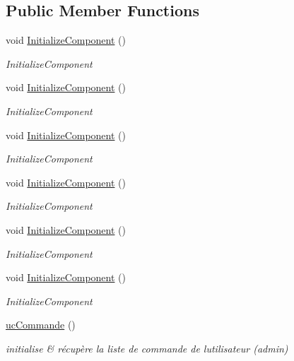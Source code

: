 \subsection*{Public Member Functions}
\begin{DoxyCompactItemize}
\item 
void \hyperlink{classnewPizza1_1_1ucCommande_a3f6251cc87dd9f2a2db45c5413ce1711}{Initialize\+Component} ()
\begin{DoxyCompactList}\small\item\em Initialize\+Component \end{DoxyCompactList}\item 
void \hyperlink{classnewPizza1_1_1ucCommande_a3f6251cc87dd9f2a2db45c5413ce1711}{Initialize\+Component} ()
\begin{DoxyCompactList}\small\item\em Initialize\+Component \end{DoxyCompactList}\item 
void \hyperlink{classnewPizza1_1_1ucCommande_a3f6251cc87dd9f2a2db45c5413ce1711}{Initialize\+Component} ()
\begin{DoxyCompactList}\small\item\em Initialize\+Component \end{DoxyCompactList}\item 
void \hyperlink{classnewPizza1_1_1ucCommande_a3f6251cc87dd9f2a2db45c5413ce1711}{Initialize\+Component} ()
\begin{DoxyCompactList}\small\item\em Initialize\+Component \end{DoxyCompactList}\item 
void \hyperlink{classnewPizza1_1_1ucCommande_a3f6251cc87dd9f2a2db45c5413ce1711}{Initialize\+Component} ()
\begin{DoxyCompactList}\small\item\em Initialize\+Component \end{DoxyCompactList}\item 
void \hyperlink{classnewPizza1_1_1ucCommande_a3f6251cc87dd9f2a2db45c5413ce1711}{Initialize\+Component} ()
\begin{DoxyCompactList}\small\item\em Initialize\+Component \end{DoxyCompactList}\item 
\hyperlink{classnewPizza1_1_1ucCommande_a88406ed23ff1661dbb4645b407849445}{uc\+Commande} ()
\begin{DoxyCompactList}\small\item\em initialise \& récupère la liste de commande de l\textquotesingle{}utilisateur (admin) \end{DoxyCompactList}\end{DoxyCompactItemize}
